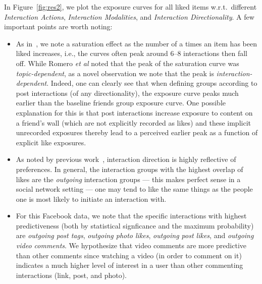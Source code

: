 In Figure~\ref{fig:res2}, we plot the exposure curves for 
all liked items w.r.t.\ different \textit{Interaction Actions},
\textit{Interaction Modalities}, and
\textit{Interaction Directionality}.  A few important points
are worth noting:
\begin{itemize}
\item As in~\cite{Romero2011hashtag}, we note a saturation
effect as the number of a times an item has been liked
increases, i.e., the curves often peak around 6--8 interactions
then fall off.  
While Romero {\it et al} noted that the
peak of the saturation curve was \emph{topic-dependent}, as a novel
observation we note that the peak is \emph{interaction-dependent}.
Indeed, one can clearly see that when defining groups according
to post interactions (of any directionality), the exposure
curve peaks much earlier than the baseline friends group
exposure curve.  One possible explanation for this is that
post interactions increase exposure to content on a friend's
wall (which are not explicitly recorded as likes) and these
implicit unrecorded exposures thereby lead to a perceived
earlier peak as a function of explicit like exposures.
\item As noted by previous work~\cite{saez2011high}, interaction
direction is highly reflective of preferences.  In general,
the interaction groups with the highest overlap of likes
are the \textit{outgoing} interaction groups --- this makes
perfect sense in a social network setting --- one may tend
to like the same things as the people one is most likely
to initiate an interaction with.
\item For this Facebook data, we note that the specific
interactions with highest predictiveness (both by
statistical signficance and the maximum probability)
are \emph{outgoing post tags}, \emph{outgoing photo likes},
\emph{outgoing post likes}, and \emph{outgoing video comments}.
We hypothesize that video comments are more predictive than
other comments since watching a video (in order to comment on it)
indicates a much higher level of interest in a user than other
commenting interactions (link, post, and photo).
\end{itemize}


